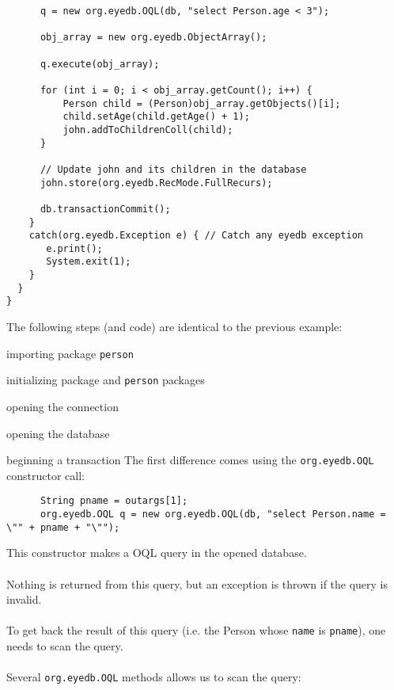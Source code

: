 {\begin{verbatim}
      q = new org.eyedb.OQL(db, "select Person.age < 3");

      obj_array = new org.eyedb.ObjectArray();

      q.execute(obj_array);

      for (int i = 0; i < obj_array.getCount(); i++) {
          Person child = (Person)obj_array.getObjects()[i];
          child.setAge(child.getAge() + 1);
          john.addToChildrenColl(child);
      }

      // Update john and its children in the database
      john.store(org.eyedb.RecMode.FullRecurs);

      db.transactionCommit();
    }
    catch(org.eyedb.Exception e) { // Catch any eyedb exception
       e.print();
       System.exit(1);
    }
  }
}
\end{verbatim}
}
The following steps (and code) are identical to the previous example:
\bi
\item importing package \texttt{person}
\item initializing \eyedb package and \texttt{person} packages
\item opening the connection
\item opening the database
\item beginning a transaction
\ei
The first difference comes using the \texttt{org.eyedb.OQL} constructor call:
{\verbsize \begin{verbatim}
      String pname = outargs[1];
      org.eyedb.OQL q = new org.eyedb.OQL(db, "select Person.name = \"" + pname + "\"");
\end{verbatim}
}
This constructor makes a \eyedb OQL query in the opened database.
\\
\\
Nothing is returned from this query, but an exception is thrown if the query
is invalid.
\\
\\
To get back the result of this query (i.e. the Person whose \texttt{name}
is \texttt{pname}), one needs to scan the query.
\\
\\
Several \texttt{org.eyedb.OQL} methods allows us to scan the query:
